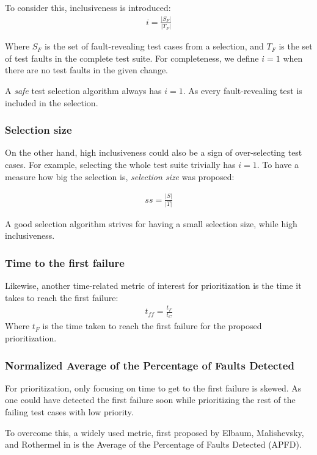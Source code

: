 To consider this, inclusiveness is introduced:
\begin{align*}
i = \frac{|S_F|}{|T_F|}
\end{align*}

Where $S_F$ is the set of fault-revealing test cases from a selection, and $T_F$ is the set of test faults in the complete
test suite. For completeness, we define $i=1$ when there are no test faults in the given change.

A \emph{safe} test selection algorithm \cite{366926} always has $i = 1$. As every fault-revealing test is included in the selection.

\subsubsection{Selection size}
On the other hand, high inclusiveness could also be a sign of over-selecting test cases. For example, selecting the whole test
suite trivially has $i=1$. To have a measure how big the selection is, \emph{selection size} was proposed:

\begin{align*}
    ss = \frac{|S|}{|T|}
\end{align*}

A good selection algorithm strives for having a small selection size, while high inclusiveness.

\subsubsection{Time to the first failure}
Likewise, another time-related metric of interest for prioritization is the time it takes to reach the first failure:
\begin{align*}
    t_{ff} = \frac{t_F}{t_C}
\end{align*}
Where $t_F$ is the time taken to reach the first failure for the proposed prioritization.

\subsubsection{Normalized Average of the Percentage of Faults Detected}
For prioritization, only focusing on time to get to the first failure is skewed. As one could have detected the first failure
soon while prioritizing the rest of the failing test cases with low priority.

To overcome this, a widely used metric, first proposed by Elbaum, Malishevsky, and Rothermel in \cite{elbaum2002} is the 
Average of the Percentage of Faults Detected (APFD).

